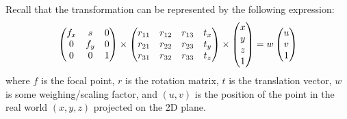 Recall that the transformation can be represented by the following expression:
\begin{align*}
    \begin{pmatrix} 
    f_x & s & $0$ \\ 
    $0$ & f_y & $0$ \\ 
    $0$ & $0$ & $1$ \end{pmatrix} \times
    \begin{pmatrix} 
    r_{11} & r_{12} & r_{13} & t_x \\ 
    r_{21} & r_{22} & r_{23} & t_y \\  
    r_{31} & r_{32} & r_{33} & t_z
    \end{pmatrix} \times 
    \begin{pmatrix} 
    x \\ 
    y \\ 
    z \\ 
    $1$ \end{pmatrix}
    = w
    \begin{pmatrix}  u \\ v \\ $1$ \end{pmatrix}
\end{align*}
where $f$ is the focal point, $r$ is the rotation matrix, $t$ is the translation vector,  $w$ is some weighing/scaling factor, and $(u, v)$ is the position of the point in the real world $(x, y, z)$ projected on the 2D plane.

